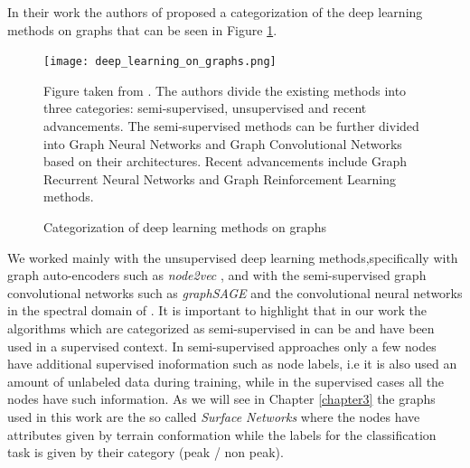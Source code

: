 In their work the authors of \cite{surveyGraphNeuralNetworks} proposed a categorization of the deep learning methods on graphs that can be seen in Figure \ref{fig:deep_learning_on_graphs}.
\begin{figure}
\centering
\texttt{[image: deep\_learning\_on\_graphs.png]}
\caption{Categorization of deep learning methods on graphs}
Figure taken from \cite{surveyGraphNeuralNetworks}. The authors divide the existing methods into three categories: semi-supervised, unsupervised
and recent advancements. The semi-supervised methods can be further divided into Graph Neural Networks and Graph Convolutional Networks based on their architectures. Recent advancements include Graph Recurrent Neural Networks and Graph Reinforcement Learning methods.
\label{fig:deep_learning_on_graphs}
\end{figure}
We worked mainly with the unsupervised deep learning methods,specifically with graph auto-encoders such as \textit{node2vec} \cite{node2vec}, and with the semi-supervised graph convolutional networks such as \textit{graphSAGE} \cite{graphSAGE} and the convolutional neural networks in the spectral domain of \cite{deferrard}. It is important to highlight that in our work the algorithms which are categorized as semi-supervised in \cite{surveyGraphNeuralNetworks} can be and have been used in a supervised context. In semi-supervised approaches only a few nodes have additional supervised inoformation such as node labels, i.e it is also used an amount of unlabeled data during training, while in the supervised cases all the nodes have such information. As we will see in Chapter \ref{chapter3} the graphs used in this work are the so called \textit{Surface Networks} where the nodes have attributes given by terrain conformation while the labels for the classification task is given by their category (peak / non peak).